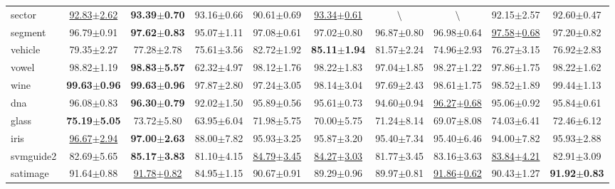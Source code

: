 \documentclass{article}
\begin{document}
\begin{table*}[t]
\begin{tabular*}{\linewidth}{@{\extracolsep{-0.25cm}}lccccccccc}
sector             &\underline{92.83$\pm$2.62} & \textbf{93.39$\pm$0.70}  &93.16$\pm$0.66      &90.61$\pm$0.69            &\underline{93.34$\pm$0.61}                    &$\setminus$                         &$\setminus$                   &92.15$\pm$2.57            &92.60$\pm$0.47\\
segment            &96.79$\pm$0.91             & \textbf{97.62$\pm$0.83}  &95.07$\pm$1.11      &97.08$\pm$0.61            &97.02$\pm$0.80       &96.87$\pm$0.80    &96.98$\pm$0.64             &\underline{97.58$\pm$0.68}&97.20$\pm$0.82\\
vehicle            &79.35$\pm$2.27             & 77.28$\pm$2.78           &75.61$\pm$3.56      &82.72$\pm$1.92            &\textbf{85.11$\pm$1.94}       &81.57$\pm$2.24    &74.96$\pm$2.93             &76.27$\pm$3.15            &76.92$\pm$2.83\\
vowel              &98.82$\pm$1.19             &\textbf{98.83$\pm$5.57}   &62.32$\pm$4.97      &98.12$\pm$1.76            &98.22$\pm$1.83       &97.04$\pm$1.85    &98.27$\pm$1.22             &97.86$\pm$1.75            &98.22$\pm$1.62\\
wine               &\textbf{99.63$\pm$0.96}    &\textbf{99.63$\pm$0.96}   &97.87$\pm$2.80      &97.24$\pm$3.05            &98.14$\pm$3.04       &97.69$\pm$2.43    &98.61$\pm$1.75             &98.52$\pm$1.89            &99.44$\pm$1.13            \\
dna                &96.08$\pm$0.83             &\textbf{96.30$\pm$0.79}   &92.02$\pm$1.50      &95.89$\pm$0.56            &95.61$\pm$0.73       &94.60$\pm$0.94    &\underline{96.27$\pm$0.68}             &95.06$\pm$0.92            &95.84$\pm$0.61\\
glass              &\textbf{75.19$\pm$5.05}    & 73.72$\pm$5.80           &63.95$\pm$6.04      &71.98$\pm$5.75            &70.00$\pm$5.75       &71.24$\pm$8.14    &69.07$\pm$8.08             &74.03$\pm$6.41            &72.46$\pm$6.12\\
iris               &\underline{96.67$\pm$2.94} &\textbf{97.00$\pm$2.63}   &88.00$\pm$7.82      &95.93$\pm$3.25            &95.87$\pm$3.20       &95.40$\pm$7.34    &95.40$\pm$6.46             &94.00$\pm$7.82            &95.93$\pm$2.88\\
svmguide2          &82.69$\pm$5.65             &\textbf{85.17$\pm$3.83}   &81.10$\pm$4.15      &\underline{84.79$\pm$3.45}&\underline{84.27$\pm$3.03}  &81.77$\pm$3.45    &83.16$\pm$3.63             &\underline{83.84$\pm$4.21}            &82.91$\pm$3.09\\
satimage           &91.64$\pm$0.88             &\underline{91.78$\pm$0.82}&84.95$\pm$1.15      &90.67$\pm$0.91            &89.29$\pm$0.96       &89.97$\pm$0.81    &\underline{91.86$\pm$0.62} &90.43$\pm$1.27            &\textbf{91.92$\pm$0.83}\\
\bottomrule
\end{tabular*}
\vspace{-0.6cm}
\end{table*}
\end{document}
